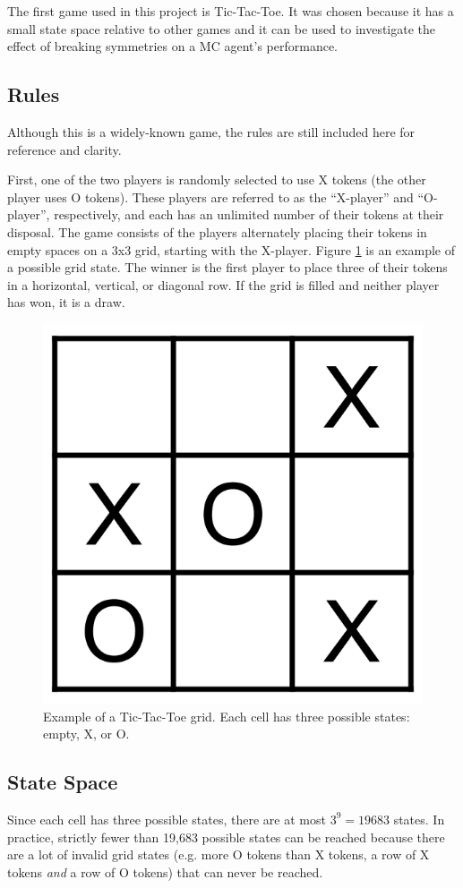 \documentclass[11pt,a4paper]{report}
\begin{document}
The first game used in this project is Tic-Tac-Toe. It was chosen because it has a small state space relative to other games and it can be used to investigate the effect of breaking symmetries on a MC agent's performance.


\subsection{Rules}

Although this is a widely-known game, the rules \cite{tic-tac-toe-rules} are still included here for reference and clarity.

First, one of the two players is randomly selected to use X tokens (the other player uses O tokens). These players are referred to as the ``X-player'' and ``O-player'', respectively, and each has an unlimited number of their tokens at their disposal. The game consists of the players alternately placing their tokens in empty spaces on a 3x3 grid, starting with the X-player. Figure \ref{tic-tac-toe-grid-example} is an example of a possible grid state. The winner is the first player to place three of their tokens in a horizontal, vertical, or diagonal row. If the grid is filled and neither player has won, it is a draw.

\begin{figure}[htbp]
	\begin{center}
		\includegraphics[width=0.3\linewidth]{tictactoe_grid_example.png}
		\caption{Example of a Tic-Tac-Toe grid. Each cell has three possible states: empty, X, or O.}
		\label{tic-tac-toe-grid-example}
	\end{center}
\end{figure}


\subsection{State Space}
\label{sec:TicTacToeStateSpace}

Since each cell has three possible states, there are at most $3^9 = 19683$ states. In practice, strictly fewer than 19,683 possible states can be reached because there are a lot of invalid grid states (e.g. more O tokens than X tokens, a row of X tokens \emph{and} a row of O tokens) that can never be reached.
\end{document}

